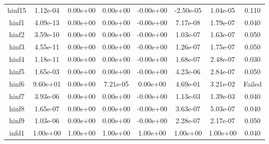 {{\begin{table}[h]
\begin{center}
{\begin{tabular}{cccccccc}
              hinf15 & 1.12e-04 & 0.00e+00 & 0.00e+00 & -0.00e+00 & -2.50e-05 & 1.04e-05 & 0.110 \\ 
               hinf1 & 4.09e-13 & 0.00e+00 & 0.00e+00 & -0.00e+00 & 7.17e-08 & 1.79e-07 & 0.040 \\ 
               hinf2 & 3.59e-10 & 0.00e+00 & 0.00e+00 & -0.00e+00 & 1.03e-07 & 1.63e-07 & 0.050 \\ 
               hinf3 & 4.55e-11 & 0.00e+00 & 0.00e+00 & -0.00e+00 & 1.26e-07 & 1.75e-07 & 0.050 \\ 
               hinf4 & 1.18e-11 & 0.00e+00 & 0.00e+00 & -0.00e+00 & 1.68e-07 & 2.48e-07 & 0.030 \\ 
               hinf5 & 1.65e-03 & 0.00e+00 & 0.00e+00 & -0.00e+00 & 4.23e-06 & 2.84e-07 & 0.050 \\ 
               hinf6 & 9.60e+01 & 0.00e+00 & 7.21e-05 & 0.00e+00 & 4.69e-01 & 3.21e-02 & Failed \\ 
               hinf7 & 3.93e-06 & 0.00e+00 & 0.00e+00 & -0.00e+00 & 1.13e-03 & 1.39e-03 & 0.040 \\ 
               hinf8 & 1.65e-07 & 0.00e+00 & 0.00e+00 & -0.00e+00 & 3.63e-07 & 5.03e-07 & 0.040 \\ 
               hinf9 & 1.03e-06 & 0.00e+00 & 0.00e+00 & -0.00e+00 & 2.28e-07 & 2.17e-07 & 0.050 \\ 
               infd1 & 1.00e+00 & 1.00e+00 & 1.00e+00& 1.00e+00& 1.00e+00 & 1.00e+00 & 0.040 \\ 
      \bottomrule
    \end{tabular}
  }  
\end{center}
\end{table}}}

